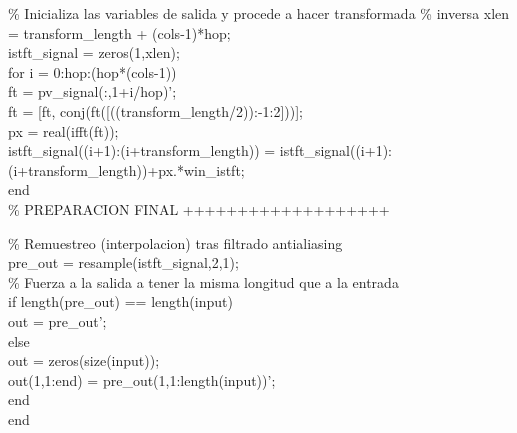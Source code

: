 \noindent \% Inicializa las variables de salida y procede a hacer transformada
\% inversa
xlen = transform\_length + (cols-1)*hop;\\
istft\_signal = zeros(1,xlen);\\
for i = 0:hop:(hop*(cols-1))\\
  ft = pv\_signal(:,1+i/hop)';\\
  ft = [ft, conj(ft([((transform\_length/2)):-1:2]))];\\
  px = real(ifft(ft));\\
  istft\_signal((i+1):(i+transform\_length)) = istft\_signal((i+1):(i+transform\_length))+px.*win\_istft;\\
end\\

\noindent \% PREPARACION FINAL +++++++++++++++++++

\noindent \% Remuestreo (interpolacion) tras filtrado antialiasing\\
pre\_out = resample(istft\_signal,2,1);\\
\% Fuerza a la salida a tener la misma longitud que a la entrada\\
if length(pre\_out) == length(input)\\
    out = pre\_out';\\
else\\
    out = zeros(size(input));\\
    out(1,1:end) = pre\_out(1,1:length(input))';\\
end\\
end\\